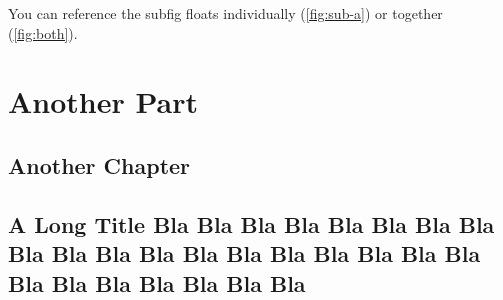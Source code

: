 You can reference the subfig floats individually (\ref{fig:sub-a}) or
together (\ref{fig:both}).

\Blindtext[1]

\part{Another Part}
\chapter{Another Chapter}
\Blindtext[2]
\chapter{A Long Title Bla Bla Bla Bla Bla Bla Bla Bla Bla Bla Bla
Bla Bla Bla Bla Bla Bla Bla Bla Bla Bla Bla Bla Bla Bla Bla}
\Blindtext[2]
\endinput
